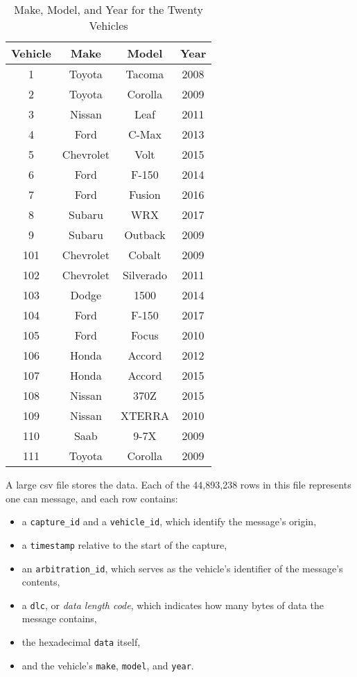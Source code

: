 \documentclass[../main.tex]{subfiles}
\begin{document}
\begin{table}
    \caption{Make, Model, and Year for the Twenty Vehicles}
    \centering
    \label{tab:vehicles}
    \begin{tabular}{|c|c|c|c|}
    \hline
    \textbf{Vehicle} & \textbf{Make} & \textbf{Model} & \textbf{Year} \\
    \hline
    1   & Toyota    & Tacoma    & 2008 \\
    2   & Toyota    & Corolla   & 2009 \\
    3   & Nissan    & Leaf      & 2011 \\
    4   & Ford      & C-Max     & 2013 \\
    5   & Chevrolet & Volt      & 2015 \\
    6   & Ford      & F-150     & 2014 \\
    7   & Ford      & Fusion    & 2016 \\
    8   & Subaru    & WRX       & 2017 \\
    9   & Subaru    & Outback   & 2009 \\
    101 & Chevrolet & Cobalt    & 2009 \\
    102 & Chevrolet & Silverado & 2011 \\
    103 & Dodge     & 1500      & 2014 \\
    104 & Ford      & F-150     & 2017 \\
    105 & Ford      & Focus     & 2010 \\
    106 & Honda     & Accord    & 2012 \\
    107 & Honda     & Accord    & 2015 \\
    108 & Nissan    & 370Z      & 2015 \\
    109 & Nissan    & XTERRA    & 2010 \\
    110 & Saab      & 9-7X      & 2009 \\
    111 & Toyota    & Corolla   & 2009 \\
    \hline
    \end{tabular}
\end{table}


A large \ac{csv} file stores the data. Each of the 44,893,238 rows in this file represents one \ac{can} message, and each row contains:

\begin{itemize}
    \item a \texttt{capture\_id} and a \texttt{vehicle\_id}, which identify the message's origin,
    \item a \texttt{timestamp} relative to the start of the capture,
    \item an \texttt{arbitration\_id}, which serves as the vehicle's identifier of the message's contents,
    \item a \texttt{dlc}, or \textit{data length code}, which indicates how many bytes of data the message contains,
    \item the hexadecimal \texttt{data} itself,
    \item and the vehicle's \texttt{make}, \texttt{model}, and \texttt{year}.
\end{itemize}
\end{document}
